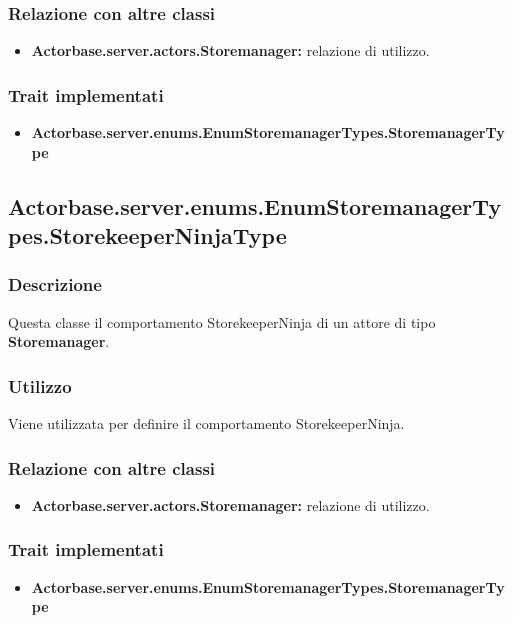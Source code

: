 \documentclass[a4paper]{article}
\begin{document}
			\subsubsection{Relazione con altre classi}
				\begin{itemize}
					\item \textbf{Actorbase.server.actors.Storemanager:} relazione di utilizzo.
				\end{itemize}
		
			\subsubsection{Trait implementati}
				\begin{itemize}
					\item \textbf{Actorbase.server.enums.EnumStoremanagerTypes.StoremanagerType} 
				\end{itemize}
				
						\subsection{Actorbase.server.enums.EnumStoremanagerTypes.StorekeeperNinjaType}
			\subsubsection{Descrizione}
				Questa classe il comportamento StorekeeperNinja di un attore di tipo \textbf{Storemanager}.
				
			\subsubsection{Utilizzo}
				Viene utilizzata per definire il comportamento StorekeeperNinja.
				
			\subsubsection{Relazione con altre classi}
				\begin{itemize}
					\item \textbf{Actorbase.server.actors.Storemanager:} relazione di utilizzo.
				\end{itemize}
		
			\subsubsection{Trait implementati}
				\begin{itemize}
					\item \textbf{Actorbase.server.enums.EnumStoremanagerTypes.StoremanagerType} 
				\end{itemize}
				
\end{document}
